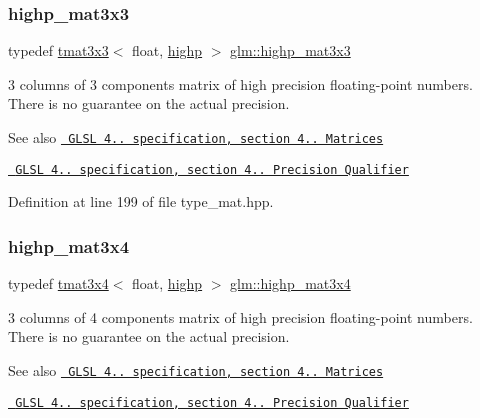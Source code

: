 \subsubsection{\texorpdfstring{highp\_mat3x3}{highp\_mat3x3}}
{\footnotesize\ttfamily typedef \mbox{\hyperlink{structglm_1_1tmat3x3}{tmat3x3}}$<$ float, \mbox{\hyperlink{namespaceglm_a0f04f086094c747d227af4425893f545ac6f7eab42eacbb10d59a58e95e362074}{highp}} $>$ \mbox{\hyperlink{group__core__precision_gac4db2c4ff089b960ddd5682abaa9e5d4}{glm\+::highp\+\_\+mat3x3}}}

3 columns of 3 components matrix of high precision floating-\/point numbers. There is no guarantee on the actual precision.

\begin{DoxySeeAlso}{See also}
\href{http://www.opengl.org/registry/doc/GLSLangSpec.4.20.8.pdf}{\texttt{ G\+L\+SL 4.. specification, section 4.. Matrices}} 

\href{http://www.opengl.org/registry/doc/GLSLangSpec.4.20.8.pdf}{\texttt{ G\+L\+SL 4.. specification, section 4.. Precision Qualifier}} 
\end{DoxySeeAlso}


Definition at line 199 of file type\+\_\+mat.\+hpp.

\mbox{\label{group__core__precision_gab51b3b8377cf9462a39a1560333a4215}} 
\subsubsection{\texorpdfstring{highp\_mat3x4}{highp\_mat3x4}}
{\footnotesize\ttfamily typedef \mbox{\hyperlink{structglm_1_1tmat3x4}{tmat3x4}}$<$ float, \mbox{\hyperlink{namespaceglm_a0f04f086094c747d227af4425893f545ac6f7eab42eacbb10d59a58e95e362074}{highp}} $>$ \mbox{\hyperlink{group__core__precision_gab51b3b8377cf9462a39a1560333a4215}{glm\+::highp\+\_\+mat3x4}}}

3 columns of 4 components matrix of high precision floating-\/point numbers. There is no guarantee on the actual precision.

\begin{DoxySeeAlso}{See also}
\href{http://www.opengl.org/registry/doc/GLSLangSpec.4.20.8.pdf}{\texttt{ G\+L\+SL 4.. specification, section 4.. Matrices}} 

\href{http://www.opengl.org/registry/doc/GLSLangSpec.4.20.8.pdf}{\texttt{ G\+L\+SL 4.. specification, section 4.. Precision Qualifier}} 
\end{DoxySeeAlso}


